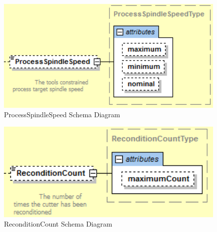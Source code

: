 \FloatBarrier


\begin{figure}[ht]
  \centering
    \includegraphics[width=1.0\textwidth]{figures/ProcessSpindleSpeed Schema.png}
  \caption{ProcessSpindleSpeed Schema Diagram}
  \label{fig:ProcessSpindleSpeed Schema Diagram}
\end{figure}

\FloatBarrier


\begin{figure}[ht]
  \centering
    \includegraphics[width=1.0\textwidth]{figures/ReconditionCount Schema.png}
  \caption{ReconditionCount Schema Diagram}
  \label{fig:ReconditionCount Schema Diagram}
\end{figure}

\FloatBarrier


